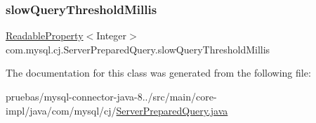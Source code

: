 \subsubsection{\texorpdfstring{slow\+Query\+Threshold\+Millis}{slowQueryThresholdMillis}}
{\footnotesize\ttfamily \mbox{\hyperlink{interfacecom_1_1mysql_1_1cj_1_1conf_1_1_readable_property}{Readable\+Property}}$<$Integer$>$ com.\+mysql.\+cj.\+Server\+Prepared\+Query.\+slow\+Query\+Threshold\+Millis\hspace{0.3cm}{\ttfamily [protected]}}



The documentation for this class was generated from the following file\+:\begin{DoxyCompactItemize}
\item 
pruebas/mysql-\/connector-\/java-\/8../src/main/core-\/impl/java/com/mysql/cj/\mbox{\hyperlink{_server_prepared_query_8java}{Server\+Prepared\+Query.\+java}}\end{DoxyCompactItemize}
